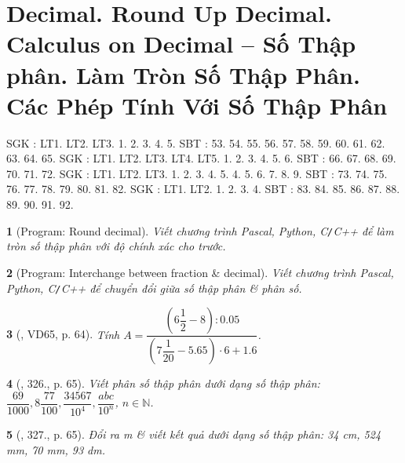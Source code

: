 \documentclass{article}
\newtheorem{baitoan}{}
\begin{document}
\section{Decimal. Round Up Decimal. Calculus on Decimal -- Số Thập phân. Làm Tròn Số Thập Phân. Các Phép Tính Với Số Thập Phân}
SGK \cite[Chap. V, \S5, pp. 44--47]{SGK_Toan_6_Canh_Dieu_tap_2}: LT1. LT2. LT3. 1. 2. 3. 4. 5. SBT \cite[Chap. V, \S5, pp. 44--45]{SBT_Toan_6_Canh_Dieu_tap_2}: 53. 54. 55. 56. 57. 58. 59. 60. 61. 62. 63. 64. 65. SGK \cite[Chap. V, \S6, pp. 48--51]{SGK_Toan_6_Canh_Dieu_tap_2}: LT1. LT2. LT3. LT4. LT5. 1. 2. 3. 4. 5. 6. SBT \cite[Chap. V, \S5, pp. 46--48]{SBT_Toan_6_Canh_Dieu_tap_2}: 66. 67. 68. 69. 70. 71. 72. SGK \cite[Chap. V, \S7, pp. 52--56]{SGK_Toan_6_Canh_Dieu_tap_2}: LT1. LT2. LT3. 1. 2. 3. 4. 5. 4. 5. 6. 7. 8. 9. SBT \cite[Chap. V, \S7, pp. 49--50]{SBT_Toan_6_Canh_Dieu_tap_2}: 73. 74. 75. 76. 77. 78. 79. 80. 81. 82. SGK \cite[Chap. V, \S8, pp. 57--60]{SGK_Toan_6_Canh_Dieu_tap_2}: LT1. LT2. 1. 2. 3. 4. SBT \cite[Chap. V, \S8, pp. 51--52]{SBT_Toan_6_Canh_Dieu_tap_2}: 83. 84. 85. 86. 87. 88. 89. 90. 91. 92.

\begin{baitoan}[{\sf Program}: Round decimal]
	Viết chương trình {\sf Pascal, Python, C{\tt/}C++} để làm tròn số thập phân với độ chính xác cho trước.
\end{baitoan}

\begin{baitoan}[{\sf Program}: Interchange between fraction \& decimal]
	Viết chương trình {\sf Pascal, Python, C{\tt/}C++} để chuyển đổi giữa số thập phân \& phân số.
\end{baitoan}

\begin{baitoan}[\cite{Tuyen_Toan_6}, VD65, p. 64]
	Tính $A = \dfrac{\left(6\dfrac{1}{2} - 8\right):0.05}{\left(7\dfrac{1}{20} - 5.65\right)\cdot6 + 1.6}$.
\end{baitoan}

\begin{baitoan}[\cite{Tuyen_Toan_6}, 326., p. 65]
	Viết phân số thập phân dưới dạng số thập phân: $\dfrac{69}{1000},8\dfrac{77}{100},\dfrac{34567}{10^4},\dfrac{abc}{10^n}$, $n\in\mathbb{N}$.
\end{baitoan}

\begin{baitoan}[\cite{Tuyen_Toan_6}, 327., p. 65]
	Đổi ra {\rm m} \& viết kết quả dưới dạng số thập phân: {\rm34 cm, 524 mm, 70 mm, 93 dm}.
\end{baitoan}
\end{document}
